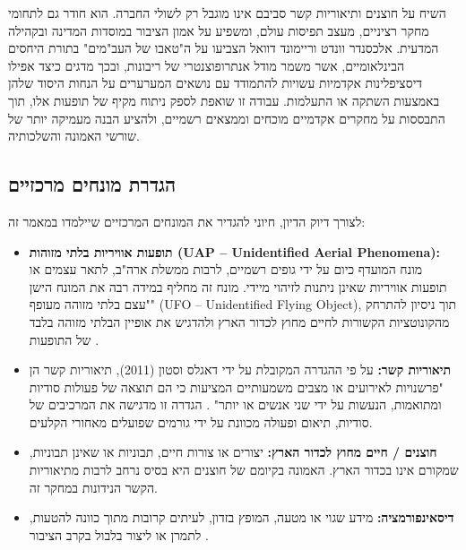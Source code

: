 \documentclass[12pt,a4paper]{article}
\begin{document}
השיח על חוצנים ותיאוריות קשר סביבם אינו מוגבל רק לשולי החברה. הוא חודר גם לתחומי מחקר רציניים, מעצב תפיסות עולם, ומשפיע על אמון הציבור במוסדות המדינה ובקהילה המדעית. אלכסנדר וונדט וריימונד דוואל \cite{Wendt2008} הצביעו על ה"טאבו של העב"מים" בתורת היחסים הבינלאומיים, אשר משמר מודל אנתרופוצנטרי של ריבונות, ובכך מדגים כיצד אפילו דיסציפלינות אקדמיות עשויות להתמודד עם נושאים המערערים על הנחות היסוד שלהן באמצעות השתקה או התעלמות. עבודה זו שואפת לספק ניתוח מקיף של תופעות אלו, תוך התבססות על מחקרים אקדמיים מוכחים וממצאים רשמיים, ולהציע הבנה מעמיקה יותר של שורשי האמונה והשלכותיה.

\subsection{הגדרת מונחים מרכזיים}
לצורך דיוק הדיון, חיוני להגדיר את המונחים המרכזיים שיילמדו במאמר זה:
\begin{itemize}
    \item \textbf{תופעות אוויריות בלתי מזוהות (UAP – Unidentified Aerial Phenomena):} מונח המועדף כיום על ידי גופים רשמיים, לרבות ממשלת ארה"ב, לתאר עצמים או תופעות אוויריות שאינן ניתנות לזיהוי מיידי. מונח זה מחליף במידה רבה את המונח הישן "עצם בלתי מזוהה מעופף" (UFO – Unidentified Flying Object), תוך ניסיון להתרחק מהקונוטציות הקשורות לחיים מחוץ לכדור הארץ ולהדגיש את אופיין הבלתי מזוהה בלבד של התופעות \cite{AARO2024report}.
    \item \textbf{תיאוריות קשר:} על פי ההגדרה המקובלת על ידי דאגלס וסטון (2011), תיאוריות קשר הן "פרשנויות לאירועים או מצבים משמעותיים המציעות כי הם תוצאה של פעולות סודיות ומתואמות, הנעשות על ידי שני אנשים או יותר" \cite{DouglasSutton2011}. הגדרה זו מדגישה את המרכיבים של סודיות, תיאום ופעולה מכוונת על ידי גורמים שפועלים מאחורי הקלעים.
    \item \textbf{חוצנים / חיים מחוץ לכדור הארץ:} יצורים או צורות חיים, תבוניות או שאינן תבוניות, שמקורם אינו בכדור הארץ. האמונה בקיומם של חוצנים היא בסיס נרחב לרבות מתיאוריות הקשר הנידונות במחקר זה.
    \item \textbf{דיסאינפורמציה:} מידע שגוי או מטעה, המופץ בזדון, לעיתים קרובות מתוך כוונה להטעות, לתמרן או ליצור בלבול בקרב הציבור \cite{AntonVugrin2022}.
\end{itemize}
\end{document}
